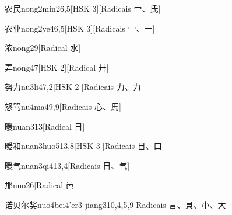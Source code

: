 \begin{entry}{农民}{nong2min2}{6,5}[HSK 3][Radicais ⼍、⽒]
\end{entry}

\begin{entry}{农业}{nong2ye4}{6,5}[HSK 3][Radicais ⼍、⼀]
\end{entry}

\begin{entry}{浓}{nong2}{9}[Radical ⽔]
\end{entry}

\begin{entry}{弄}{nong4}{7}[HSK 2][Radical ⼶]
\end{entry}

\begin{entry}{努力}{nu3li4}{7,2}[HSK 2][Radicais ⼒、⼒]
\end{entry}

\begin{entry}{怒骂}{nu4ma4}{9,9}[Radicais ⼼、⾺]
\end{entry}

\begin{entry}{暖}{nuan3}{13}[Radical ⽇]
\end{entry}

\begin{entry}{暖和}{nuan3huo5}{13,8}[HSK 3][Radicais ⽇、⼝]
\end{entry}

\begin{entry}{暖气}{nuan3qi4}{13,4}[Radicais ⽇、⽓]
\end{entry}

\begin{entry}{那}{nuo2}{6}[Radical ⾢]
\end{entry}

\begin{entry}{诺贝尔奖}{nuo4bei4'er3 jiang3}{10,4,5,9}[Radicais ⾔、⾙、⼩、⼤]
\end{entry}

